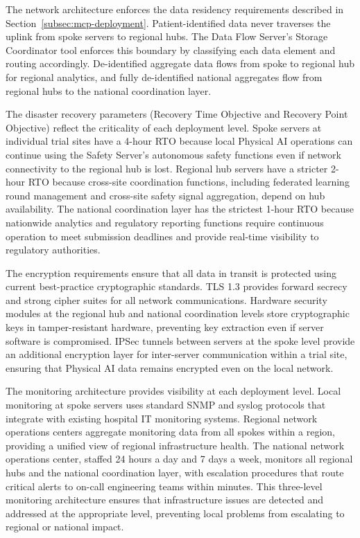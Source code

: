 The network architecture enforces the data residency requirements described in
Section~\ref{subsec:mcp-deployment}. Patient-identified data never traverses
the uplink from spoke servers to regional hubs. The Data Flow Server's Storage
Coordinator tool enforces this boundary by classifying each data element and
routing accordingly. De-identified aggregate data flows from spoke to regional
hub for regional analytics, and fully de-identified national aggregates flow
from regional hubs to the national coordination layer.

The disaster recovery parameters (Recovery Time Objective and Recovery Point
Objective) reflect the criticality of each deployment level. Spoke servers at
individual trial sites have a 4-hour RTO because local Physical AI operations
can continue using the Safety Server's autonomous safety functions even if
network connectivity to the regional hub is lost. Regional hub servers have a
stricter 2-hour RTO because cross-site coordination functions, including
federated learning round management and cross-site safety signal aggregation,
depend on hub availability. The national coordination layer has the strictest
1-hour RTO because nationwide analytics and regulatory reporting functions
require continuous operation to meet submission deadlines and provide real-time
visibility to regulatory authorities.

The encryption requirements ensure that all data in transit is protected using
current best-practice cryptographic standards. TLS 1.3 provides forward secrecy
and strong cipher suites for all network communications. Hardware security
modules at the regional hub and national coordination levels store cryptographic
keys in tamper-resistant hardware, preventing key extraction even if server
software is compromised. IPSec tunnels between servers at the spoke level
provide an additional encryption layer for inter-server communication within a
trial site, ensuring that Physical AI data remains encrypted even on the local
network.

The monitoring architecture provides visibility at each deployment level. Local
monitoring at spoke servers uses standard SNMP and syslog protocols that
integrate with existing hospital IT monitoring systems. Regional network
operations centers aggregate monitoring data from all spokes within a region,
providing a unified view of regional infrastructure health. The national
network operations center, staffed 24 hours a day and 7 days a week, monitors
all regional hubs and the national coordination layer, with escalation
procedures that route critical alerts to on-call engineering teams within
minutes. This three-level monitoring architecture ensures that infrastructure
issues are detected and addressed at the appropriate level, preventing local
problems from escalating to regional or national impact.

